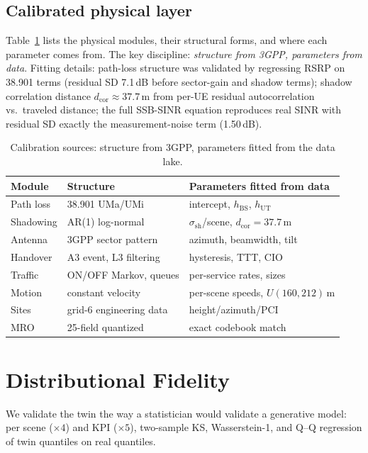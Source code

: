 \documentclass[10pt,conference]{IEEEtran}
\begin{document}
\subsection{Calibrated physical layer}
Table~\ref{tab:calibration} lists the physical modules, their structural forms, and where each parameter comes from.
The key discipline: \emph{structure from 3GPP, parameters from data}.
Fitting details: path-loss structure was validated by regressing RSRP on 38.901 terms (residual SD 7.1\,dB before sector-gain and shadow terms); shadow correlation distance $d_{\mathrm{cor}}\!\approx\!37.7$\,m from per-UE residual autocorrelation vs.\ traveled distance; the full SSB-SINR equation reproduces real SINR with residual SD exactly the measurement-noise term (1.50\,dB).

\begin{table}[t]
\centering
\caption{Calibration sources: structure from 3GPP, parameters fitted from the data lake.}
\label{tab:calibration}
\small
\setlength{\tabcolsep}{2.5pt}
\footnotesize
\begin{tabular}{@{}lll@{}}
\toprule
Module & Structure & Parameters fitted from data \\
\midrule
Path loss & 38.901 UMa/UMi & intercept, $h_{\mathrm{BS}}$, $h_{\mathrm{UT}}$ \\
Shadowing & AR(1) log-normal & $\sigma_{\mathrm{sh}}$/scene, $d_{\mathrm{cor}}{=}37.7$\,m \\
Antenna & 3GPP sector pattern & azimuth, beamwidth, tilt \\
Handover & A3 event, L3 filtering & hysteresis, TTT, CIO \\
Traffic & ON/OFF Markov, queues & per-service rates, sizes \\
Motion & constant velocity & per-scene speeds, $U(160,212)$\,m \\
Sites & grid-6 engineering data & height/azimuth/PCI \\
MRO & 25-field quantized & exact codebook match \\
\bottomrule
\end{tabular}
\end{table}

\section{Distributional Fidelity}
\label{sec:fidelity}
We validate the twin the way a statistician would validate a generative model: per scene ($\times4$) and KPI ($\times5$), two-sample KS, Wasserstein-1, and Q--Q regression of twin quantiles on real quantiles.
\end{document}
